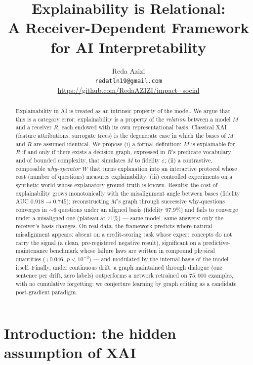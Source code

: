 \documentclass[10pt]{article}
\title{\bfseries Explainability is Relational:\\A Receiver-Dependent Framework for AI Interpretability}
\author{%
  Reda Azizi\\
  \small\texttt{redatln19@gmail.com}\\
  \small\url{https://github.com/RedaAZIZI/impact_social}%
}
\date{}
\theoremstyle{definition}
\theoremstyle{plain}
\begin{document}
\maketitle

\begin{abstract}
Explainability in AI is treated as an intrinsic property of the model. We argue that this is a category error: explainability is a property of the \emph{relation} between a model $M$ and a receiver $R$, each endowed with its own representational basis. Classical XAI (feature attributions, surrogate trees) is the degenerate case in which the bases of $M$ and $R$ are assumed identical. We propose (i) a formal definition: $M$ is explainable for $R$ if and only if there exists a decision graph, expressed in $R$'s predicate vocabulary and of bounded complexity, that simulates $M$ to fidelity $\varepsilon$; (ii) a contrastive, composable \emph{why-operator} $W$ that turns explanation into an interactive protocol whose cost (number of questions) measures explainability; (iii) controlled experiments on a synthetic world whose explanatory ground truth is known. Results: the cost of explainability grows monotonically with the misalignment angle between bases (fidelity AUC $0.918 \to 0.745$); reconstructing $M$'s graph through successive why-questions converges in ${\sim}6$ questions under an aligned basis (fidelity $97.9\%$) and fails to converge under a misaligned one (plateau at $71\%$) --- same model, same answers: only the receiver's basis changes. On real data, the framework predicts where natural misalignment appears: absent on a credit-scoring task whose expert concepts do not carry the signal (a clean, pre-registered negative result), significant on a predictive-maintenance benchmark whose failure laws are written in compound physical quantities ($+0.046$, $p < 10^{-3}$) --- and modulated by the internal basis of the model itself. Finally, under continuous drift, a graph maintained through dialogue (one sentence per drift, zero labels) outperforms a network retrained on $75{,}000$ examples, with no cumulative forgetting: we conjecture learning by graph editing as a candidate post-gradient paradigm.
\end{abstract}

\section{Introduction: the hidden assumption of XAI}
\label{sec:intro}
\end{document}
